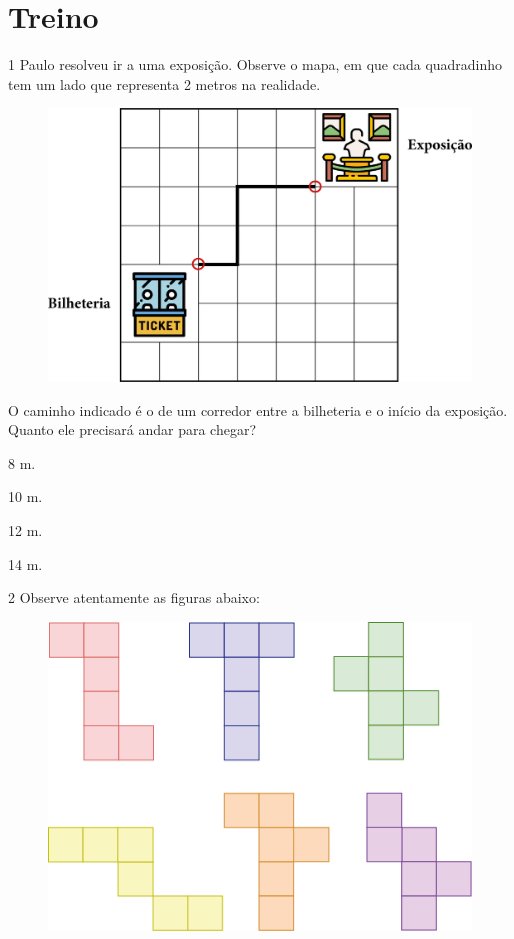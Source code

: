 \section{Treino}

\num{1} Paulo resolveu ir a uma exposição. Observe o mapa, em que cada quadradinho tem um lado que representa 2 metros na realidade.

\begin{figure}[htpb!]
\centering
\includegraphics[width=\textwidth]{media/image35.png}
\end{figure}

O caminho indicado é o de um corredor entre a bilheteria e o início da exposição.
Quanto ele precisará andar para chegar?

\begin{escolha}
\item
  8 m.
\item
  10 m.
\item
  12 m.
\item
  14 m.
\end{escolha}

\pagebreak
\num{2} Observe atentamente as figuras abaixo:

\begin{figure}[htpb!]
\centering
\includegraphics[width=.7\textwidth]{media/image36.png}
\end{figure}

